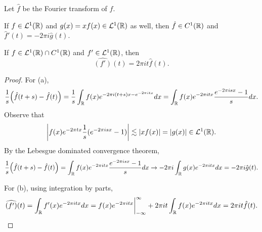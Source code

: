 \begin{proposition}
    Let $\hat{f}$ be the Fourier transform of $f$. 
    \begin{thmenum}
        \item If $f\in\mathcal{L}^1(\mathbb{R})$ and $g(x) = xf(x)\in\mathcal{L}^1(\mathbb{R})$ as well, then 
        $\hat{f}\in C^1(\mathbb{R})$ and $\hat{f}'(t) = -2\pi i\hat{g}(t)$.
        \item If $f\in\mathcal{L}^1(\mathbb{R})\cap C^1(\mathbb{R})$ and $f'\in\mathcal{L}^1(\mathbb{R})$, then 
        \begin{equation*}
            \widehat{(f')}(t) = 2\pi i t\hat{f}(t).
        \end{equation*}
    \end{thmenum}
\end{proposition}
\begin{proof}
    For (a), 
    \begin{equation*}
        \frac{1}{s}\pth{\hat{f}(t+s) - \hat{f}(t)} 
        = \frac{1}{s}\int_{\R}f(x)e^{-2\pi i(t+s)x - e^{-2\pi itx}}dx 
        = \int_{\R}f(x)e^{-2\pi itx}\frac{e^{-2\pi isx} - 1}{s}dx.
    \end{equation*}
    Observe that 
    \begin{equation*}
        \left\lvert {f(x)e^{-2\pi tx}\frac{1}{s}(e^{-2\pi isx} - 1)} \right\rvert 
        \lesssim \left\lvert {xf(x)} \right\rvert = \left\lvert {g(x)} \right\rvert\in\mathcal{L}^1(\mathbb{R}).
    \end{equation*}
    By the Lebesgue dominated convergence theorem, 
    \begin{equation*}
        \frac{1}{s}\pth{\hat{f}(t+s) - \hat{f}(t)} = \int_{\R}f(x)e^{-2\pi itx}\frac{e^{-2\pi isx} - 1}{s}dx 
        \to -2\pi i\int_{\R}g(x)e^{-2\pi itx}dx = -2\pi i\hat{g}(t).
    \end{equation*}

    For (b), using integration by parts,
    \begin{equation*}
        \widehat{(f')}(t) = \int_{\mathbb{R}}f'(x)e^{-2\pi itx}dx 
        = f(x)e^{-2\pi itx}\bigg|_{-\infty}^{\infty} + 2\pi it\int_{\mathbb{R}}f(x)e^{-2\pi itx}dx 
        = 2\pi it\hat{f}(t).
    \end{equation*}
\end{proof}

